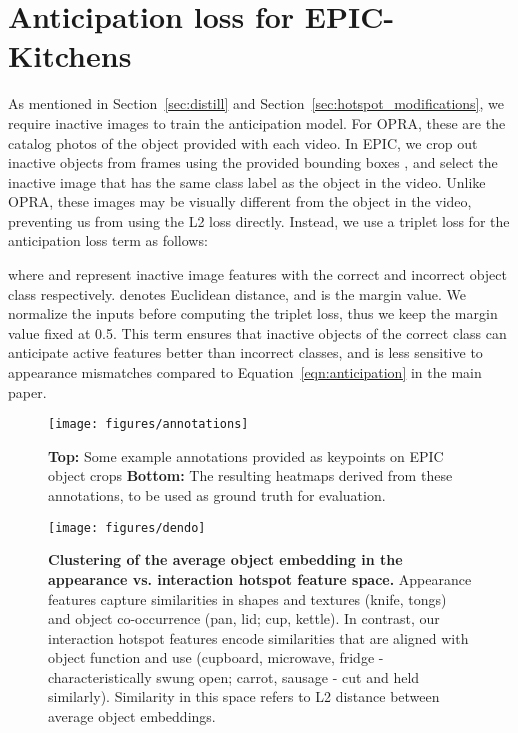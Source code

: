 \documentclass[10pt,twocolumn,letterpaper]{article}
\newcommand{\refeqn}[1]{Equation~\ref{#1}}
\newcommand{\refsec}[1]{Section~\ref{#1}}
\begin{document}
\section{Anticipation loss for EPIC-Kitchens} \label{sec:l_ant}
As mentioned in \refsec{sec:distill} and \refsec{sec:hotspot_modifications}, we require inactive images to train the anticipation model. For OPRA, these are the catalog photos of the object provided with each video. In EPIC, we crop out inactive objects from frames using the provided bounding boxes , and select the inactive image that has the same class label as the object in the video. Unlike OPRA, these images may be visually different from the object in the video, preventing us from using the L2 loss directly. Instead, we use a triplet loss for the anticipation loss term as follows:

where  and  represent inactive image features with the correct and incorrect object class respectively.  denotes Euclidean distance, and  is the margin value. We normalize the inputs before computing the triplet loss, thus we keep the margin value fixed at 0.5. This term ensures that inactive objects of the correct class can anticipate active features better than incorrect classes, and is less sensitive to appearance mismatches compared to \refeqn{eqn:anticipation} in the main paper.


\begin{figure}[t!]
\centering
\texttt{[image: figures/annotations]}
\caption{\textbf{Top:} Some example annotations provided as keypoints on EPIC object crops \textbf{Bottom:} The resulting heatmaps derived from these annotations, to be used as ground truth for evaluation.}
\label{fig:annotations}
\end{figure}


\begin{figure*}[t!]
\centering
\texttt{[image: figures/dendo]}
\caption{\textbf{Clustering of the average object embedding in the appearance vs. interaction hotspot feature space.} Appearance features capture similarities in shapes and textures (knife, tongs) and object co-occurrence (pan, lid; cup, kettle). In contrast, our interaction hotspot features encode similarities that are aligned with object function and use (cupboard, microwave, fridge - characteristically swung open; carrot, sausage - cut and held similarly). Similarity in this space refers to L2 distance between average object embeddings.}
\label{fig:dendograms}
\end{figure*}
\end{document}

